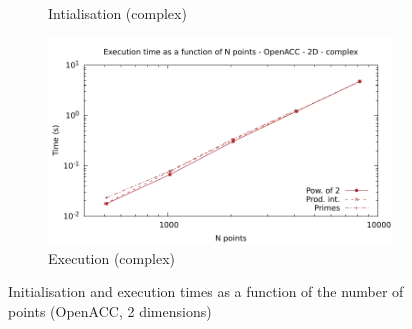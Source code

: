 \documentclass[12pt, a4paper]{article}
\begin{document}
\begin{figure}[H]
\begin{subfigure}{.5\textwidth}
\caption{Intialisation (complex)}
\label{FFTACC2DCI}
\end{subfigure}%
\begin{subfigure}{.5\textwidth}
\centering
\includegraphics[width=.9\linewidth]{graphs/fft-openacc-2d-pow2-c-exec.pdf}
\caption{Execution (complex)}
\label{FFTACC2DCE}
\end{subfigure}
\caption{Initialisation and execution times as a function of the number of points (OpenACC, 2 dimensions)}
\label{FFTCL2D}
\end{figure}
\end{document}
